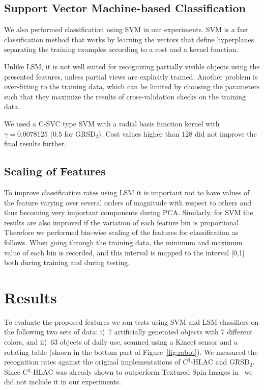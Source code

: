 \documentclass[a4paper, 10 pt, conference]{sty/ieeeconf}
\begin{document}
\subsection{Support Vector Machine-based Classification}
We also performed classification using SVM in our experiments.
SVM is a fast classification method that works by learning the vectors that define hyperplanes separating
the training examples according to a cost and a kernel function.

Unlike LSM, it is not well suited for recognizing partially visible objects using the presented features,
unless partial views are explicitly trained. Another problem is over-fitting to the training data, which
can be limited by choosing the parameters such that they maximize the results of cross-validation checks
on the training data.

We used a C-SVC type SVM with a radial basis function kernel \cite{LIBSVM} with $\gamma = 0.0078125$
($0.5$ for GRSD$_2$). Cost values higher than $128$ did not improve the final results further.

\subsection{Scaling of Features}
To improve classification rates using LSM it is important not to have values of the feature 
varying over several orders of magnitude with respect to others and thus becoming very important components
during PCA. Similarly, for SVM the results are also improved if the variation of each feature bin is
proportional. Therefore we performed bin-wise scaling of the features for classification as follows.
When going through the training data, the minimum and maximum value of each bin is recorded, and this interval 
is mapped to the interval [0,1] both during training and during testing.


\section{Results}
\label{sec:results}
To evaluate the proposed features we ran
tests using SVM and LSM classifiers on the following two sets of data: 
i)~7 artificially generated objects with 7 different colors, and
ii)~63 objects of daily use, scanned using a Kinect sensor and a rotating table
(shown in the bottom part of Figure~\ref{fig:robot}). 
We measured the recognition rates against the original implementations of C$^3$-HLAC and 
GRSD$_2$.
Since C$^3$-HLAC was already shown to outperform Textured Spin Images in~\cite{kanezaki2010icra}
we did not include it in our experiments.
\end{document}
